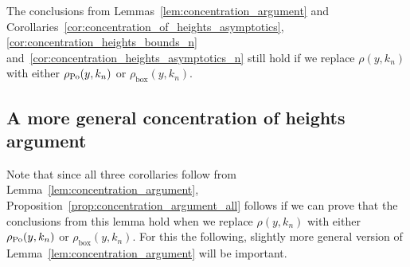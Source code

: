 \begin{proposition}\label{prop:concentration_argument_all}
The conclusions from Lemmas~\ref{lem:concentration_argument} and Corollaries~\ref{cor:concentration_of_heights_asymptotics}, \ref{cor:concentration_heights_bounds_n} and~\ref{cor:concentration_heights_asymptotics_n} still hold if we replace $\rho(y,k_n)$ with either $\rho_{{\mathrm{Po}}}(y,k_n)$ or $\rho_{\text{box}}(y,k_n)$.
\end{proposition}

\subsection{A more general concentration of heights argument}\label{ssec:general_concentration_lemma}

Note that since all three corollaries follow from Lemma~\ref{lem:concentration_argument}, Proposition~\ref{prop:concentration_argument_all} follows if we can prove that the conclusions from this lemma hold when we replace $\rho(y,k_n)$ with either $\rho_{{\mathrm{Po}}}(y,k_n)$ or $\rho_{\text{box}}(y,k_n)$. For this the following, slightly more general version of Lemma~\ref{lem:concentration_argument} will be important.


